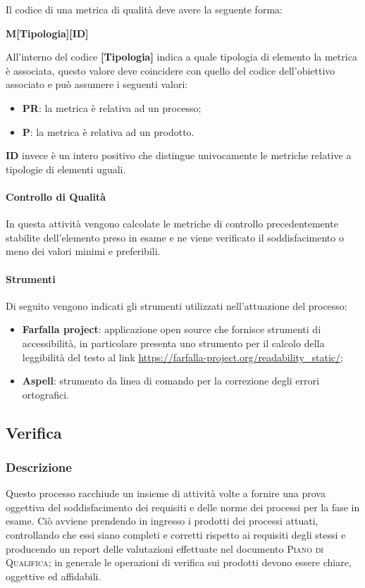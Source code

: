Il codice di una metrica di qualità deve avere la seguente forma:
\begin{center}
    \textbf{M[Tipologia][ID]}
\end{center}
All'interno del codice \textbf{[Tipologia]} indica a quale tipologia di elemento la metrica è associata, questo valore deve coincidere con
quello del codice dell'obiettivo associato e può assumere i seguenti valori:
\begin{itemize}
	\item \textbf{PR}: la metrica è relativa ad un processo;
	\item \textbf{P}: la metrica è relativa ad un prodotto.
\end{itemize}
\textbf{ID} invece è un intero positivo che distingue univocamente le metriche relative a tipologie di elementi uguali.

\paragraph{Controllo di Qualità}
\label{par:controllo_qualita}

In questa attività vengono calcolate le metriche di controllo precedentemente stabilite dell'elemento preso in esame e ne viene verificato
il soddisfacimento o meno dei valori minimi e preferibili.

\paragraph{Strumenti}
\label{par:gestione_qualita:strumenti}

Di seguito vengono indicati gli strumenti utilizzati nell'attuazione del processo:
\begin{itemize}
	\item \textbf{Farfalla project}: applicazione open source che fornisce strumenti di accessibilità, in particolare presenta uno
		strumento per il calcolo della leggibilità del testo al link \url{https://farfalla-project.org/readability_static/};
	\item \textbf{Aspell}: strumento da linea di comando per la correzione degli errori ortografici.
\end{itemize}



\subsection{Verifica}
\label{sub:verifica}

\subsubsection{Descrizione}
Questo processo racchiude un insieme di attività volte a fornire una prova oggettiva del soddisfacimento dei requisiti e delle norme dei
processi per la fase in esame. Ciò avviene prendendo in ingresso i prodotti dei processi attuati, controllando che essi siano completi e corretti
rispetto ai requisiti degli stessi e producendo un report delle valutazioni effettuate nel documento \textsc{Piano di Qualifica}; in
generale le operazioni di verifica sui prodotti devono essere chiare, oggettive ed affidabili.

